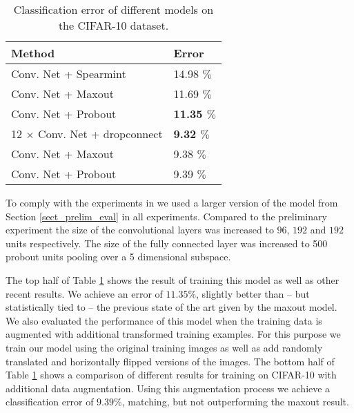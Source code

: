 \documentclass{article} \pdfoutput=1
\begin{document}
\begin{table}[t]
\vskip 0.15in
\caption{Classification error of different models on the
  CIFAR-10 dataset.}
\begin{center}
\begin{small}
\begin{sc}
\begin{tabular}{l|l}
Method  & Error \\
\hline
Conv. Net + Spearmint \cite{Snoek2012} & 14.98 $\%$ \\
Conv. Net + Maxout    \cite{Goodfellow2013}  & 11.69 $\%$ \\
Conv. Net + Probout   & \textbf{11.35 $\%$} \\
\hline
12 $\times$ Conv. Net + dropconnect \cite{WanLi2013} & \textbf{9.32 $\%$} \\
Conv. Net + Maxout \cite{Goodfellow2013} &
                                                                    9.38 $\%$ \\
Conv. Net + Probout & 9.39 $\%$ \\
\hline
\end{tabular}
\end{sc}
\end{small}
\end{center}
\vskip -0.1in
\label{cifar10_results}
\end{table}
To comply with the experiments in \cite{Goodfellow2013} we used a
larger version of the model from Section \ref{sect_prelim_eval} in all
experiments. Compared to the preliminary experiment the size
of the convolutional layers was increased to $96$, $192$ and $192$ units
respectively. The size of the fully connected layer was increased to
500 probout units pooling over a 5 dimensional subspace.

The top half of Table \ref{cifar10_results} shows the result of
training this model as well as other recent results. We achieve an
error of $11.35 \%$, slightly better than -- but statistically tied to --
the previous state of the art given by the maxout model. We also evaluated the performance of this
model when the training data is augmented with additional
transformed training examples. For this purpose we train our model
using the original training images as well as add randomly translated
and horizontally flipped versions of the images. The bottom half of
Table \ref{cifar10_results} shows a comparison of different results
for training on CIFAR-10 with additional data augmentation. Using this
augmentation process we achieve a classification error of $9.39 \%$,
matching, but not outperforming the maxout result.
\end{document}
